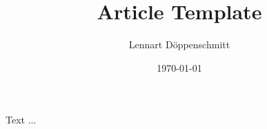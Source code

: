 \documentclass[11pt]{article}
\title{Article Template}
\author{Lennart Döppenschmitt}
\date{\today}
\begin{document}
\maketitle

\noindent
Text ... \cite{l19}


\end{document}
